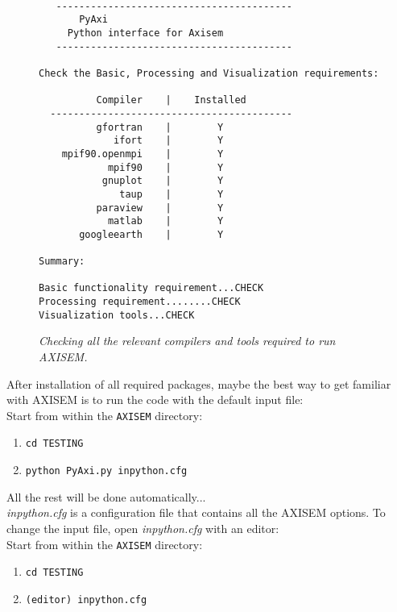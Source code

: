 \begin{figure*}[htb]
\begin{center}
\begin{verbatim}

   -----------------------------------------
       PyAxi
     Python interface for Axisem
   -----------------------------------------

Check the Basic, Processing and Visualization requirements:

          Compiler    |    Installed
  ------------------------------------------
          gfortran    |        Y
             ifort    |        Y
    mpif90.openmpi    |        Y
            mpif90    |        Y
           gnuplot    |        Y
              taup    |        Y
          paraview    |        Y
            matlab    |        Y
       googleearth    |        Y

Summary:

Basic functionality requirement...CHECK
Processing requirement........CHECK
Visualization tools...CHECK
\end{verbatim}
\end{center}
\caption{\textit{Checking all the relevant compilers and tools required to run AXISEM.}}
\label{check_pyaxi}
\end{figure*}


\noindent After installation of all required packages,
maybe the best way to get familiar with AXISEM is to run the code with the default input file:\\

Start from within the {\tt AXISEM} directory:
\begin{enumerate}
\itemsep0em
\item {\tt cd TESTING}
\item {\tt python PyAxi.py inpython.cfg}
\end{enumerate}

All the rest will be done automatically...\\

\noindent \textit{inpython.cfg} is a configuration file that contains all the AXISEM options.
To change the input file, open \textit{inpython.cfg} with an editor:\\

Start from within the {\tt AXISEM} directory:
\begin{enumerate}
\itemsep0em
\item {\tt cd TESTING}
\item {\tt (editor) inpython.cfg}
\end{enumerate}



